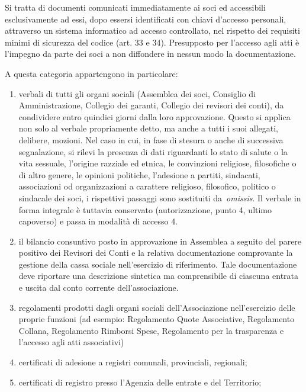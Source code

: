 Si tratta di documenti comunicati immediatamente ai soci ed accessibili
esclusivamente ad essi, dopo essersi identificati con chiavi d’accesso
personali, attraverso un sistema informatico ad accesso controllato, nel
rispetto dei requisiti minimi di sicurezza del codice (art. 33 e 34).
Presupposto per l’accesso agli atti è l’impegno da parte dei soci a non
diffondere in nessun modo la documentazione.  

A questa categoria appartengono in particolare:

\begin{enumerate}
    \item verbali di tutti gli organi sociali (Assemblea dei soci, Consiglio
        di Amministrazione, Collegio dei garanti, Collegio dei revisori dei
        conti), da condividere entro quindici giorni dalla loro
        approvazione. Questo si applica non solo al verbale propriamente
        detto, ma anche a tutti i suoi allegati, delibere, mozioni.
        Nel caso in cui, in fase di stesura o anche di successiva segnalazione, si
        rilevi la presenza di dati riguardanti lo stato di salute o la vita
        sessuale, l’origine razziale ed etnica, le convinzioni religiose,
        filosofiche o di altro genere, le opinioni politiche, l’adesione a partiti,
        sindacati, associazioni od organizzazioni a carattere religioso, filosofico,
        politico o sindacale dei soci, i rispettivi passaggi sono sostituiti
        da \emph{omissis}. Il verbale in forma integrale è tuttavia conservato
        (autorizzazione, punto 4, ultimo capoverso) e passa in modalità di accesso
        4.
    \item il bilancio consuntivo posto in approvazione in Assemblea a seguito
        del parere positivo dei Revisori dei Conti e la relativa
        documentazione comprovante la gestione della cassa sociale
        nell’esercizio di riferimento. Tale documentazione deve riportare
        una descrizione sintetica ma comprensibile di ciascuna entrata e uscita
        dal conto corrente dell'associazione.
    \item regolamenti prodotti dagli organi sociali dell’Associazione
        nell’esercizio delle proprie funzioni (ad esempio: Regolamento Quote
        Associative, Regolamento Collana, Regolamento Rimborsi Spese,
        Regolamento per la trasparenza e l’accesso agli atti associativi) 
    \item certificati di adesione a registri comunali, provinciali, regionali;
    \item certificati di registro presso l’Agenzia delle entrate e del Territorio;

\end{enumerate}
